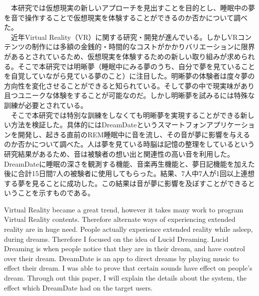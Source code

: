 
\begin{jabstract}
　本研究では仮想現実の新しいアプローチを見出すことを目的とし、睡眠中の夢を音で操作することで仮想現実を体験することができるのか否かについて調べた。\\
　近年Virtual Reality（VR）に関する研究・開発が進んでいる。しかしVRコンテンツの制作には多額の金銭的・時間的なコストがかかりバリエーションに限界があるとされているため、仮想現実を体験するための新しい取り組みが求められる。そこで本研究では明晰夢（睡眠中にみる夢のうち、自分で夢を見ていることを自覚していながら見ている夢のこと）に注目した。明晰夢の体験者は度々夢の方向性を変化させることができると知られている。そして夢の中で現実味があり且つユニークな体験をすることが可能なのだ。しかし明晰夢を試みるには特殊な訓練が必要とされている。\\
　そこで本研究では特別な訓練をしなくても明晰夢を実現することができる新しい方法を検証した。具体的にはDreamDateというスマートフォンアプリケーションを開発し、起きる直前のREM睡眠中に音を流し、その音が夢に影響を与えるのか否かについて調べた。人は夢を見ている時脳は記憶の整理をしているという研究結果があるため、音は被験者の想い出と関連性の高い音を利用した。DreamDateに睡眠の深さを観測する機能、音楽再生機能と、夢日記機能を加えた後に合計15日間7人の被験者に使用してもらった。結果、7人中7人が1回以上連想する夢を見ることに成功した。この結果は音が夢に影響を及ぼすことができるということを示すものである。

\end{jabstract}

\begin{eabstract}
Virtual Reality became a great trend, however it takes many work to program Virtual Reality contents. Therefore alternate ways of experiencing extended reality are in huge need. People actually experience extended reality while asleep, during dreams. Therefore I focused on the idea of Lucid Dreaming. Lucid Dreaming is when people notice that they are in their dream, and have control over their dream. DreamDate is an app to direct dreams by playing music to effect their dream. I was able to prove that certain sounds have effect on people’s dream. Through out this paper, I will explain the details about the system, the effect which DreamDate had on the target users.
\end{eabstract}
